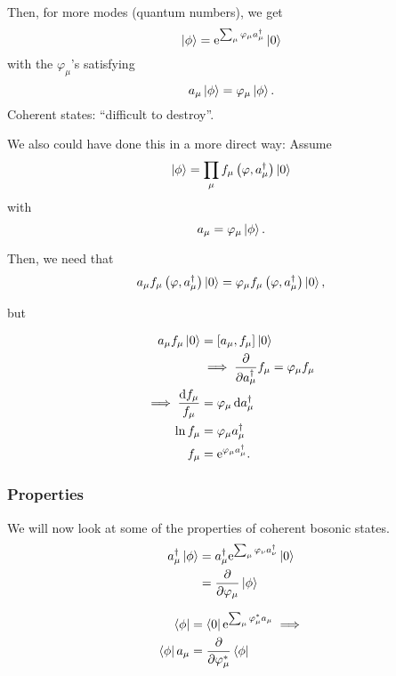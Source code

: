 Then, for more modes (quantum numbers), we get
\begin{equation}
\ket{\phi} = \mathrm{e}^{\sum_\mu\varphi_\mu a_\mu^\dagger}\ket{0}
\end{equation}
with the $\varphi_\mu$'s satisfying
\begin{equation}
a_\mu\ket{\phi} = \varphi_\mu\ket{\phi}.
\end{equation}
Coherent states: ``difficult to destroy''.

We also could have done this in a more direct way:
Assume
\begin{equation}
\ket{\phi} = \prod_\mu f_\mu\left(\varphi, a_\mu^\dagger\right)\ket{0}
\end{equation}
with 
\begin{equation}
a_\mu =\varphi_\mu\ket{\phi}.
\end{equation}

Then, we need that 
\begin{equation}
a_\mu f_\mu\left(\varphi, a_\mu^\dagger\right)\ket{0} = \varphi_\mu f_\mu\left(\varphi, a_\mu^\dagger\right)\ket{0},
\end{equation}

but

\begin{align}
a_\mu f_\mu \ket{0} &= \comm{a_\mu}{f_\mu}\ket{0}\\
&\implies \pdv{a_\mu^\dagger} f_\mu = \varphi_\mu f_\mu \\
\implies \frac{\dd{f_\mu}}{{f_\mu}} &= \varphi_\mu \dd{a_\mu^\dagger} \\
\ln f_\mu &= \varphi_\mu a_\mu^\dagger \\
f_\mu &= \e^{\varphi_\mu a_\mu^\dagger}.
\end{align}

\subsubsection{Properties}
We will now look at some of the properties of coherent bosonic states. 
\begin{align}
a_\mu^\dagger\ket{\phi} &= a_\mu^\dagger\mathrm{e}^{\sum_\mu\varphi_\nu a_\nu^\dagger}\ket{0}\\
&= \pdv{\varphi_\mu}\ket{\phi}
\end{align}

\begin{align}
\bra{\phi} &= \bra{0}\mathrm{e}^{\sum_\mu \varphi_\mu^*a_\mu} \implies\\
\bra{\phi}a_\mu &= \pdv{\varphi_\mu^*}\bra{\phi}
\end{align}

